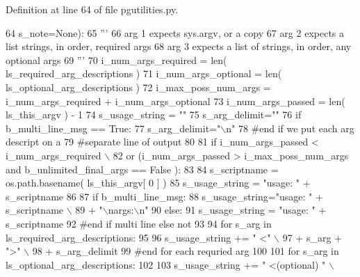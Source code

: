 Definition at line 64 of file pgutilities.\+py.


\begin{DoxyCode}
64             s\_note=\textcolor{keywordtype}{None}):
65     \textcolor{stringliteral}{'''}
66 \textcolor{stringliteral}{    arg 1 expects sys.argv, or a copy}
67 \textcolor{stringliteral}{    arg 2 expects a list strings, in order, required args}
68 \textcolor{stringliteral}{    arg 3 expects a list of strings, in order, any optional args}
69 \textcolor{stringliteral}{    '''}
70     i\_num\_args\_required = len( ls\_required\_arg\_descriptions )
71     i\_num\_args\_optional = len( ls\_optional\_arg\_descriptions )
72     i\_max\_poss\_num\_args = i\_num\_args\_required + i\_num\_args\_optional 
73     i\_num\_args\_passed = len( ls\_this\_argv ) - 1  
74     s\_usage\_string = \textcolor{stringliteral}{""}
75     s\_arg\_delimit=\textcolor{stringliteral}{""}
76     \textcolor{keywordflow}{if} b\_multi\_line\_msg == \textcolor{keyword}{True}:
77         s\_arg\_delimit=\textcolor{stringliteral}{"\(\backslash\)n"}
78     \textcolor{comment}{#end if we put each arg descript on a }
79     \textcolor{comment}{#separate line of output}
80 
81     \textcolor{keywordflow}{if} i\_num\_args\_passed <  i\_num\_args\_required  \(\backslash\)
82             \textcolor{keywordflow}{or} (i\_num\_args\_passed > i\_max\_poss\_num\_args \textcolor{keywordflow}{and} b\_unlimited\_final\_args == \textcolor{keyword}{False} ): 
83     
84         s\_scriptname = os.path.basename( ls\_this\_argv[ 0 ] )    
85         s\_usage\_string = \textcolor{stringliteral}{"usage: "} + s\_scriptname 
86 
87         \textcolor{keywordflow}{if} b\_multi\_line\_msg:
88             s\_usage\_string=\textcolor{stringliteral}{"usage: "} + s\_scriptname \(\backslash\)
89                     + \textcolor{stringliteral}{"\(\backslash\)nargs:\(\backslash\)n"}
90         \textcolor{keywordflow}{else}:
91             s\_usage\_string = \textcolor{stringliteral}{"usage: "} + s\_scriptname 
92         \textcolor{comment}{#end if multi line else not}
93 
94         \textcolor{keywordflow}{for} s\_arg \textcolor{keywordflow}{in} ls\_required\_arg\_descriptions:
95 
96             s\_usage\_string += \textcolor{stringliteral}{" <"} \(\backslash\)
97                 + s\_arg + \textcolor{stringliteral}{">"} \(\backslash\)
98                 + s\_arg\_delimit
99         \textcolor{comment}{#end for each requried arg}
100 
101         \textcolor{keywordflow}{for} s\_arg \textcolor{keywordflow}{in} ls\_optional\_arg\_descriptions:
102 
103             s\_usage\_string += \textcolor{stringliteral}{" <(optional) "} \(\backslash\)

\end{DoxyCode}
